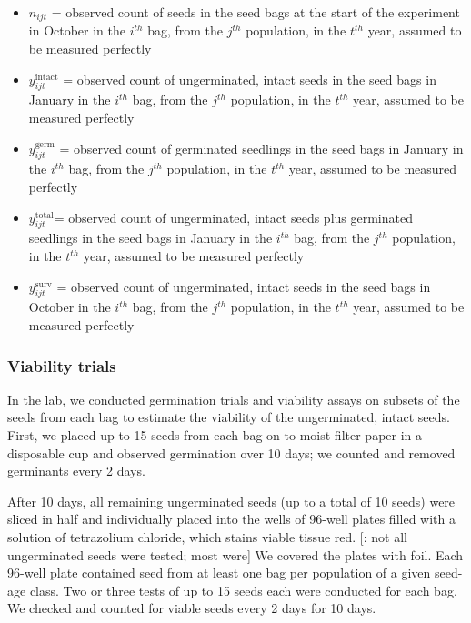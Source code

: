 \documentclass[12pt, oneside, titlepage]{article}   	%
\begin{document}
\begin{itemize}
	\item $n_{ijt}$ = observed count of seeds in the seed bags at the start of the experiment in October in the $i^{th}$ bag, from the $j^{th}$ population, in the $t^{th}$ year, assumed to be measured perfectly 
	\item $y^{\mathrm{intact}}_{ijt}$ = observed count of ungerminated, intact seeds in the seed bags in January in the $i^{th}$ bag, from the $j^{th}$ population, in the $t^{th}$ year,  assumed to be measured perfectly 
	\item $y^{\mathrm{germ}}_{ijt}$ = observed count of germinated seedlings in the seed bags in January in the $i^{th}$ bag, from the $j^{th}$ population, in the $t^{th}$ year, assumed to be measured perfectly 
	\item $y^{\mathrm{total}}_{ijt}$= observed count of ungerminated, intact seeds plus germinated seedlings in the seed bags in January in the $i^{th}$ bag, from the $j^{th}$ population, in the $t^{th}$ year, assumed to be measured perfectly 	
	\item $y^{\mathrm{surv}}_{ijt}$ = observed count of ungerminated, intact seeds in the seed bags in October in the $i^{th}$ bag, from the $j^{th}$ population, in the $t^{th}$ year, assumed to be measured perfectly 	
\end{itemize}

\subsubsection*{Viability trials}

In the lab, we conducted germination trials and viability assays on subsets of the seeds from each bag to estimate the viability of the ungerminated, intact seeds. First, we placed up to 15 seeds from each bag on to moist filter paper in a disposable cup and observed germination over 10 days; we counted and removed germinants every 2 days. 

After 10 days, all remaining ungerminated seeds (up to a total of 10 seeds) were sliced in half and individually placed into the wells of 96-well plates filled with a solution of tetrazolium chloride, which stains viable tissue red. [\cite{eckhart2011}: not all ungerminated seeds were tested; most were] We covered the plates with foil. Each 96-well plate contained seed from at least one bag per population of a given seed-age class. Two or three tests of up to 15 seeds each were conducted for each bag. We checked and counted for viable seeds every 2 days for 10 days. 
\end{document}
